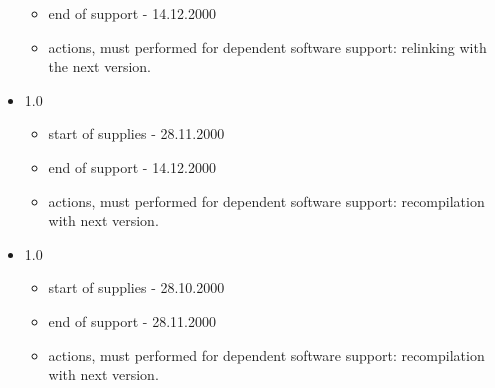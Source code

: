 \documentclass[10pt]{article}
\begin{document}
\begin{itemize}
\begin{itemize}
   \item end of support - 14.12.2000 
   \item actions, must performed for dependent software support: 
        relinking with the next version.
  \end{itemize}
  \item 1.0
  \begin{itemize}
   \item start of supplies - 28.11.2000
   \item end of support - 14.12.2000 
   \item actions, must performed for dependent software support: 
        recompilation with next version.
  \end{itemize}
  \item 1.0
  \begin{itemize}
   \item start of supplies - 28.10.2000
   \item end of support - 28.11.2000 
   \item actions, must performed for dependent software support: 
        recompilation with next version.
  \end{itemize}
 \end{itemize}
\end{document}
